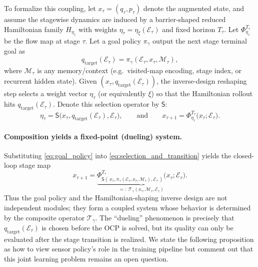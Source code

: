 To formalize this coupling, let $x_\tau=(q_\tau,p_\tau)$ denote the augmented state, and assume the stagewise dynamics are induced
by a barrier-shaped reduced Hamiltonian family $H_{\eta_\tau}$ with weights $\eta_\tau=\eta_\xi(\mathcal E_\tau)$ and fixed horizon $T_\tau$.
Let $\Phi^{T_\tau}_{\eta_\tau}$ be the flow map at stage $\tau$. Let a goal policy $\pi_\gamma$ output the next stage terminal goal as
\begin{equation}
q_{\mathrm{target}}(\mathcal{E}_\tau) = \pi_\gamma(\mathcal E_\tau, x_\tau, \mathcal M_\tau),
\label{eq:goal_policy}
\end{equation}
where $\mathcal M_\tau$ is any memory/context (e.g.\ visited-map encoding, stage index, or recurrent hidden state).
Given $(x_\tau,q_{\mathrm{target}}(\mathcal{E}_{\tau}))$, the inverse-design reshaping step selects a weight vector $\eta_\tau$ (or equivalently $\xi$) so that the Hamiltonian rollout hits $q_{\mathrm{target}}(\mathcal{E}_{\tau})$.
Denote this selection operator by $\mathsf S$:
\begin{equation}
\eta_\tau = \mathsf S\big(x_\tau,q_{\mathrm{target}}(\mathcal{E}_{\tau}),\mathcal E_\tau\big),
\qquad\text{and}\qquad
x_{\tau+1} = \Phi^{T_\tau}_{\eta_\tau}\big(x_\tau;\mathcal E_\tau\big).
\label{eq:selection_and_transition}
\end{equation}

\paragraph{Composition yields a fixed-point (dueling) system.}
Substituting \cref{eq:goal_policy} into \cref{eq:selection_and_transition} yields the closed-loop stage map
\begin{equation}
x_{\tau+1}
=
\underbrace{\Phi^{T_\tau}_{\mathsf S(\,x_\tau,\pi_\gamma(\mathcal E_\tau,x_\tau,\mathcal M_\tau),\mathcal E_\tau\,)}
\big(x_\tau;\mathcal E_\tau\big)}_{=:~\mathcal T_{\gamma}(x_\tau,\mathcal M_\tau,\mathcal E_\tau)}.
\label{eq:closed_loop_stage_map}
\end{equation}
Thus the goal policy and the Hamiltonian-shaping inverse design are not independent modules; they form a coupled system
whose behavior is determined by the composite operator $\mathcal T_{\gamma}$.
The “dueling” phenomenon is precisely that $q_{\mathrm{target}}(\mathcal{E}_{\tau})$ is chosen before the OCP is solved, but its quality
can only be evaluated after the stage transition is realized. We state the following proposition as how to view sensor policy's role in the training pipeline but comment out that this joint learning problem remains an open question.

